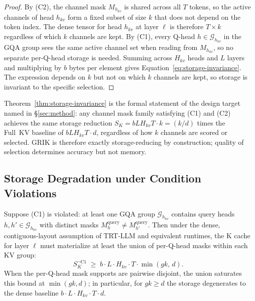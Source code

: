 \documentclass{article}
\begin{document}
\begin{proof}
By (C2), the channel mask $M_{h_{kv}}$ is shared across all $T$ tokens, so the active channels of head $h_{kv}$ form a fixed subset of size $k$ that does not depend on the token index. The dense tensor for head $h_{kv}$ at layer $\ell$ is therefore $T \times k$ regardless of which $k$ channels are kept. By (C1), every Q-head $h \in \mathcal{G}_{h_{kv}}$ in the GQA group sees the same active channel set when reading from $M_{h_{kv}}$, so no separate per-Q-head storage is needed. Summing across $H_{kv}$ heads and $L$ layers and multiplying by $b$ bytes per element gives Equation~\ref{eq:storage-invariance}. The expression depends on $k$ but not on which $k$ channels are kept, so storage is invariant to the specific selection.
\end{proof}
 
\begin{remark}
Theorem~\ref{thm:storage-invariance} is the formal statement of the design target named in \S\ref{sec:method}: any channel mask family satisfying (C1) and (C2) achieves the same storage reduction $S_K = b L H_{kv} T \cdot k = (k/d)$ times the Full~KV baseline of $b L H_{kv} T \cdot d$, regardless of how $k$ channels are scored or selected. GRIK is therefore exactly storage-reducing by construction; quality of selection determines accuracy but not memory.
\end{remark}
 
\subsection{Storage Degradation under Condition Violations}
\label{app:storage-degradation}
 
\begin{proposition}[C1 Violation]
\label{prop:c1-violation}
Suppose (C1) is violated: at least one GQA group $\mathcal{G}_{h_{kv}}$ contains query heads $h, h' \in \mathcal{G}_{h_{kv}}$ with distinct masks $M_h^{\mathrm{query}} \neq M_{h'}^{\mathrm{query}}$. Then under the dense, contiguous-layout assumption of TRT-LLM and equivalent runtimes, the K cache for layer $\ell$ must materialize at least the union of per-Q-head masks within each KV group:
\begin{equation}
S_K^{\neg \mathrm{C1}} \;\geq\; b \cdot L \cdot H_{kv} \cdot T \cdot \min(g k, \, d).
\end{equation}
When the per-Q-head mask supports are pairwise disjoint, the union saturates this bound at $\min(gk, d)$; in particular, for $gk \geq d$ the storage degenerates to the dense baseline $b \cdot L \cdot H_{kv} \cdot T \cdot d$.
\end{proposition}
 
\end{document}
